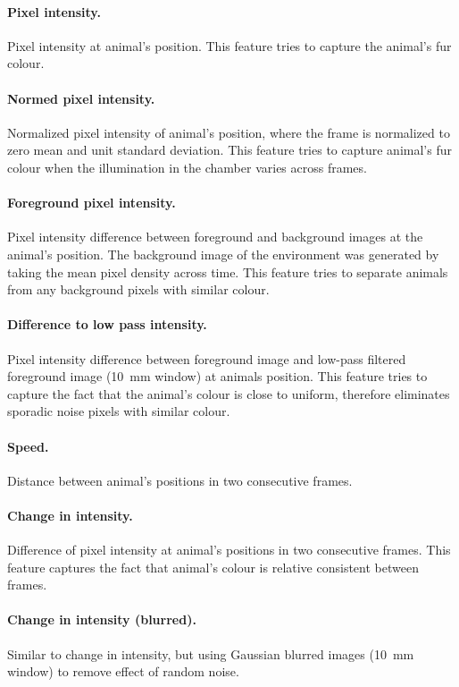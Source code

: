 \paragraph{Pixel intensity.} Pixel intensity at animal's position. This feature tries to capture the animal's fur colour.

\paragraph{Normed pixel intensity.} Normalized pixel intensity of animal's position, where the frame is normalized to zero mean and unit standard deviation. This feature tries to capture animal's fur colour when the illumination in the chamber varies across frames.

\paragraph{Foreground pixel intensity.} Pixel intensity difference between foreground and background images at the animal's position. The background image of the environment was generated by taking the mean pixel density across time. This feature tries to separate animals from any background pixels with similar colour.

\paragraph{Difference to low pass intensity.} Pixel intensity difference between foreground image and low-pass filtered foreground image (\SI{10}{\mm} window) at animals position. This feature tries to capture the fact that the animal's colour is close to uniform, therefore eliminates sporadic noise pixels with similar colour.

\paragraph{Speed.} Distance between animal's positions in two consecutive frames. 

\paragraph{Change in intensity.} Difference of pixel intensity at animal's positions in two consecutive frames. This feature captures the fact that animal's colour is relative consistent between frames.

\paragraph{Change in intensity (blurred).} Similar to change in intensity, but using Gaussian blurred images (\SI{10}{\mm} window) to remove effect of random noise.

